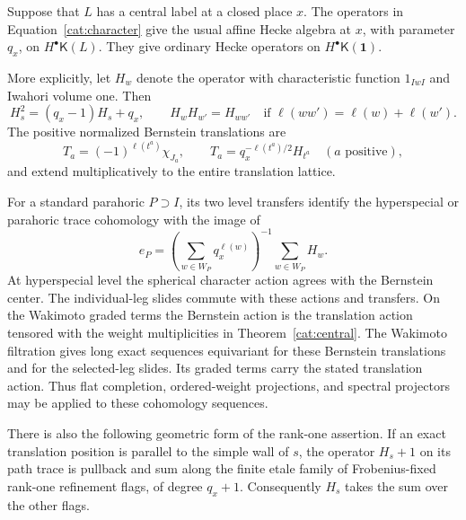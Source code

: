 \begin{proposition}\label{cat:hecke}
Suppose that $L$ has a central label at a closed place $x$.
The operators in Equation~\eqref{cat:character} give the usual
affine Hecke algebra at $x$, with parameter $q_x$, on
$H^\bullet\mathsf K(L)$. They give ordinary Hecke operators on
$H^\bullet\mathsf K(\mathbf1)$.

More explicitly, let $H_w$ denote the operator with characteristic
function $1_{IwI}$ and Iwahori volume one. Then
\[
 H_s^2=(q_x-1)H_s+q_x,
 \qquad H_wH_{w'}=H_{ww'}\quad
       \text{if }\ell(ww')=\ell(w)+\ell(w').
\]
The positive normalized Bernstein translations are
\begin{equation}\label{cat:translation-sign}
 T_a=(-1)^{\ell(t^a)}\chi_{J_a},
 \qquad
 T_a=q_x^{-\ell(t^a)/2}H_{t^a}\quad(a\text{ positive}),
\end{equation}
and extend multiplicatively to the entire translation lattice.

For a standard parahoric $P\supset I$, its two level transfers
identify the hyperspecial or parahoric trace cohomology with the image of
\[
 e_P=\left(\sum_{w\in W_P}q_x^{\ell(w)}\right)^{-1}
                  \sum_{w\in W_P}H_w.
\]
At hyperspecial level the spherical character action agrees
with the Bernstein center. The individual-leg slides commute
with these actions and transfers. On the Wakimoto graded terms
the Bernstein action is the translation action tensored with
the weight multiplicities in Theorem~\ref{cat:central}.
The Wakimoto filtration gives long exact sequences equivariant for
these Bernstein translations and for the selected-leg slides.
Its graded terms carry the stated translation action. Thus flat
completion, ordered-weight projections, and spectral projectors
may be applied to these cohomology sequences.

There is also the following geometric form of the rank-one
assertion. If an exact translation position is parallel to the
simple wall of $s$, the operator $H_s+1$ on its path trace is
pullback and sum along the finite etale family of Frobenius-fixed
rank-one refinement flags, of degree $q_x+1$. Consequently
$H_s$ takes the sum over the other flags.
\end{proposition}

